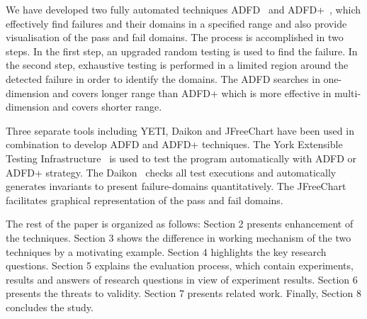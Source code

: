 We have developed two fully automated techniques ADFD~\cite{ahmad2013adfd} and ADFD+~\cite{ahmad2014adfd2}, which effectively find failures and their domains in a specified range and also provide visualisation of the pass and fail domains. The process is accomplished in two steps. In the first step, an upgraded random testing is used to find the failure. In the second step, exhaustive testing is performed in a limited region around the detected failure in order to identify the domains. The ADFD searches in one-dimension and covers longer range than ADFD+ which is more effective in multi-dimension and covers shorter range.

Three separate tools including YETI, Daikon and JFreeChart have been used in combination to develop ADFD and ADFD+ techniques. The York Extensible Testing Infrastructure~\cite{Oriol2011yeti} is used to test the program automatically with ADFD or ADFD+ strategy. The Daikon~\cite{ernst2007daikon} checks all test executions and automatically generates invariants to present failure-domains quantitatively. The JFreeChart~\cite{gilbert2008jfreechart} facilitates graphical representation of the pass and fail domains.




The rest of the paper is organized as follows: Section 2 presents enhancement of the techniques. Section 3 shows the difference in working mechanism of the two techniques by a motivating example. Section 4 highlights the key research questions. Section 5 explains the evaluation process, which contain experiments, results and answers of research questions in view of experiment results. Section 6 presents the threats to validity. Section 7 presents related work. Finally, Section 8 concludes the study.


 


